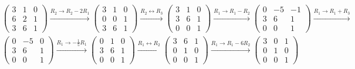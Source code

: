 \begin{enumerate}
{							\begin{answer}
								\begin{align*}
									&\begin{pmatrix}
										3 & 1 & 0\\
										6 & 2 & 1\\
										3 & 6 & 1
									\end{pmatrix}\xrightarrow[]{R_{2}\rightarrow R_{2}-2R_{1}}
									\begin{pmatrix}
										3 & 1 & 0\\
										0 & 0 & 1\\
										3 & 6 & 1
									\end{pmatrix}\xrightarrow[]{R_{2}\leftrightarrow R_{3}}
									\begin{pmatrix}
										3 & 1 & 0\\
										3 & 6 & 1\\
										0 & 0 & 1
									\end{pmatrix}\xrightarrow[]{R_{1}\rightarrow R_{1}-R_{2}}
									\begin{pmatrix}
										0 & -5 & -1\\
										3 & 6 & 1\\
										0 & 0 & 1
									\end{pmatrix}\xrightarrow[]{R_{1}\rightarrow R_{1}+R_{3}}\\[5mm]
									&\begin{pmatrix}
										0 & -5 & 0\\
										3 & 6 & 1\\
										0 & 0 & 1
									\end{pmatrix}\xrightarrow[]{R_{1}\rightarrow-\frac{1}{5}R_{1}}
									\begin{pmatrix}
										0 & 1 & 0\\
										3 & 6 & 1\\
										0 & 0 & 1
									\end{pmatrix}\xrightarrow[]{R_{1}\leftrightarrow R_{2}}
									\begin{pmatrix}
										3 & 6 & 1\\
										0 & 1 & 0\\
										0 & 0 & 1
									\end{pmatrix}\xrightarrow[]{R_{1}\rightarrow R_{1}-6R_{2}}
									\begin{pmatrix}
										3 & 0 & 1\\
										0 & 1 & 0\\
										0 & 0 & 1

\end{pmatrix}
\end{align*}
\end{answer}}
\end{enumerate}
